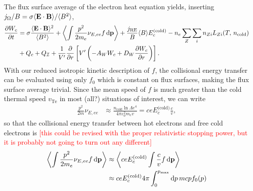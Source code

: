 \documentclass[11pt,a4paper]{article}
\newcommand{\rd}{\ensuremath{\mathrm{d}}}
\newcommand{\sub}[1]{\ensuremath{_{\text{#1}}}}
\renewcommand{\b}[1]{\ensuremath{ {\bf #1 } }}
\begin{document}
The flux surface average of  the electron heat equation yields, inserting $j_\Omega/B = \sigma \langle \b{E}\cdot\b{B}\rangle/\langle B^2\rangle$, 
\begin{align}
\frac{\partial W_c}{\partial t} &= \sigma \frac{\langle \b{E}\cdot\b{B}\rangle^2}{\langle B^2\rangle}+ \left\langle\int  \frac{p^2}{2m_e}\nu_{E,ee} f \,\rd \b{p}\right\rangle + \frac{j\sub{RE}}{B}\langle B\rangle E_c^\text{(cold)} -n_e \sum_Z \sum_i n_{Zi}L_{Zi}(T,\,n\sub{cold})   \nonumber \\
&+ Q_c + Q_\mathcal{I} + \frac{1}{V'}\frac{\partial}{\partial r}\left[V'\left(-A_W W_c + D_W\frac{\partial W_c}{\partial r}\right)\right].
\end{align}
With our reduced isotropic kinetic description of $f$, the collisional energy transfer can be evaluated using only $f_0$ which is constant on flux surfaces, making the flux surface average trivial.
%
%
Since the mean speed of $f$ is much greater than the cold thermal speed $v\sub{Te}$ in most (all?) situations of interest, we can write
\begin{align}
\frac{p^2}{2m}\nu_{E,ee} &\approx \frac{n\sub{cold}\ln\Lambda e^4}{4\pi\varepsilon_0^2 m_e v} = ceE_c^\text{(cold)}\frac{c}{v},
\end{align}
so that the collisional energy transfer between hot electrons and free cold electrons is \textcolor{red}{[this could be revised with the proper relativistic stopping power, but it is probably not going to turn out any different]}
\begin{align}
\left\langle \int  \frac{p^2}{2m_e}\nu_{E,ee} f \,\rd \b{p} \right\rangle &\approx \left\langle ceE_c^\text{(cold)} \int \frac{c}{v}f\,\rd\b{p}\right\rangle\nonumber \\
 &\approx ceE_c^\text{(cold)}4\pi \int_0^{p\sub{max}} \rd p  \, mcp f_0(p)
\end{align}

\end{document}
